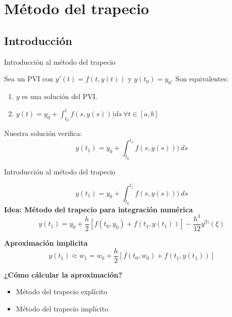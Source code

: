 \section{Método del trapecio}

	\subsection{Introducción}

		\begin{frame}{Introducción al método del trapecio}
			\fontsize{11}{11}\selectfont				
			\begin{proposition} \label{prop:sol-eq}
				Sea un PVI con $y'(t) = f(t,y(t))$ y $y(t_0) = y_0$.  Son equivalentes:
				\begin{enumerate}
					\item $y$ es una solución del PVI.
					\item $y(t) = y_0 + \int_{t_0}^{t} f(s,y(s))) ds \ \forall t \in [a,b]$
				\end{enumerate}
			\end{proposition}

			\kern 7mm
			\begin{tcolorbox}[colback=ChetwodeBlue!10,colframe=ChetwodeBlue!60]
				Nuestra solución verifica:
				\begin{equation*}
					y(t_1)  = y_0 + \int_{t_0}^{t_1} f(s,y(s))) \ ds
				\end{equation*}		
			\end{tcolorbox}
		\end{frame}

		\begin{frame}{Introducción al método del trapecio}
			\fontsize{9}{9}\selectfont				

			\begin{tcolorbox}[colback=ChetwodeBlue!10,colframe=ChetwodeBlue!60]
				\centering
				\kern -5mm
				\begin{equation*}
				y(t_1)  = y_0 + \int_{t_0}^{t_1} f(s,y(s))) \ ds
				\end{equation*}		
				\textbf{Idea: Método del trapecio para integración numérica}
				\begin{equation} \label{eq:trapecio-igualdad}
					y(t_{1}) = y_0 + \frac{h}{2} \left[f(t_0,y_0) + f(t_1, y(t_1))\right] - \frac{h^3}{12}y^{3)}(\xi)
				\end{equation}

				\textbf{Aproximación implicita}	
				\begin{equation} \label{eq:app}
					y(t_1) \approx w_1 = w_0 + \frac{h}{2} \left[f(t_0,w_0) + f(t_1, y(t_1))\right]
				\end{equation}			
			\end{tcolorbox}			

			{\centering\textbf{¿Cómo cálcular la aproximación?}}
			\begin{itemize}
				\item Método del trapecio explícito
				\item Método del trapecio implícito
			\end{itemize}
		\end{frame}



